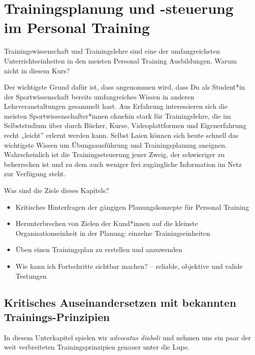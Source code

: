 \documentclass[
  letterpaper,
  DIV=11,
  numbers=noendperiod]{scrreprt}
\providecommand{\tightlist}{%
  \setlength{\itemsep}{0pt}\setlength{\parskip}{0pt}}
\begin{document}

\chapter{Trainingsplanung und -steuerung im Personal
Training}\label{sec-trainingsplanung}

Trainingswissenschaft und Trainingslehre sind eine der umfangreichsten
Unterrichtseinheiten in den meisten Personal Training Ausbildungen.
Warum nicht in diesem Kurs?

Der wichtigste Grund dafür ist, dass angenommen wird, dass Du als
Student*in der Sportwissenschaft bereits umfangreiches Wissen in anderen
Lehrveranstaltungen gesammelt hast. Aus Erfahrung interessieren sich die
meisten Sportwissenschafter*innen ohnehin stark für Trainingslehre, die
im Selbststudium über durch Bücher, Kurse, Videoplattformen und
Eigenerfahrung recht „leicht'' erlernt werden kann. Selbst Laien können
sich heute schnell das wichtigste Wissen um Übungsausführung und
Trainingsplanung aneignen. Wahrscheinlich ist die Trainingssteuerung
jener Zweig, der schwieriger zu beherrschen ist und zu dem auch weniger
frei zugängliche Information im Netz zur Verfügung steht.

Was sind die Ziele dieses Kapitels?

\begin{itemize}
\tightlist
\item
  Kritisches Hinterfragen der gängigen Planungskonzepte für Personal
  Training
\item
  Herunterbrechen von Zielen der Kund*innen auf die kleinste
  Organisationseinheit in der Planung: einzelne Trainingseinheiten
\item
  Üben einen Trainingsplan zu erstellen und anzuwenden
\item
  Wie kann ich Fortschritte sichtbar machen? -- reliable, objektive und
  valide Testungen
\end{itemize}

\section{Kritisches Auseinandersetzen mit bekannten
Trainings-Prinzipien}\label{kritisches-auseinandersetzen-mit-bekannten-trainings-prinzipien}

In diesem Unterkapitel spielen wir \emph{advocatus diaboli} und nehmen
uns ein paar der weit verbreiteten Trainingsprinzipien genauer unter die
Lupe.
\end{document}
